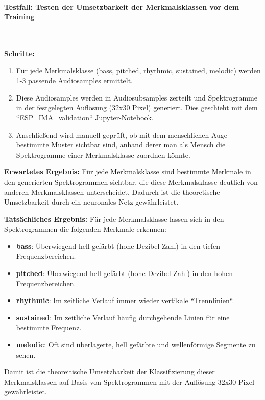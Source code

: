 \paragraph{Testfall: Testen der Umsetzbarkeit der Merkmalsklassen vor dem Training}\mbox{}\\
\begin{adjustwidth}{0.5cm}{0cm}
\textbf{Schritte:}

\begin{enumerate}
	\item Für jede Merkmalsklasse (bass, pitched, rhythmic, sustained, melodic) werden 1-3 passende Audiosamples ermittelt.
	\item Diese Audiosamples werden in Audiosubsamples zerteilt und Spektrogramme in der festgelegten Auflösung (32x30 Pixel) generiert. Dies geschieht mit dem ``ESP\_IMA\_validation`` Jupyter-Notebook.
	\item Anschließend wird manuell geprüft, ob mit dem menschlichen Auge bestimmte Muster sichtbar sind, anhand derer man als Mensch die Spektrogramme einer Merkmalsklasse zuordnen könnte.
\end{enumerate}

\textbf{Erwartetes Ergebnis:} 
Für jede Merkmalsklasse sind bestimmte Merkmale in den generierten Spektrogrammen sichtbar, die diese Merkmalsklasse deutlich von anderen Merkmalsklassen unterscheidet. Dadurch ist die theoretische Umsetzbarkeit durch ein neuronales Netz gewährleistet.

\textbf{Tatsächliches Ergebnis:} Für jede Merkmalsklasse lassen sich in den Spektrogrammen die folgenden Merkmale erkennen:

\begin{itemize}
  \item \textbf{bass}: Überwiegend hell gefärbt (hohe Dezibel Zahl) in den tiefen Frequenzbereichen.
  \item \textbf{pitched}: Überwiegend hell gefärbt (hohe Dezibel Zahl) in den hohen Frequenzbereichen.
  \item \textbf{rhythmic}: Im zeitliche Verlauf immer wieder vertikale ``Trennlinien``.
  \item \textbf{sustained}: Im zeitliche Verlauf häufig durchgehende Linien für eine bestimmte Frequenz.
  \item \textbf{melodic}: Oft sind überlagerte, hell gefärbte und wellenförmige Segmente zu sehen.
\end{itemize}

Damit ist die theoreitische Umsetzbarkeit der Klassifizierung dieser Merkmalsklassen auf Basis von Spektrogrammen mit der Auflösung 32x30 Pixel gewährleistet.

\end{adjustwidth}



